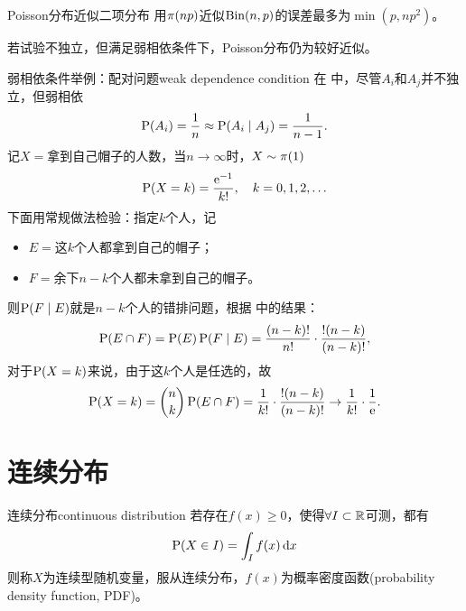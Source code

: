 \begin{theorem}{Poisson分布近似二项分布}{}
	用$\PoisDist(np)$近似$\BinDist(n,p)$的误差最多为$\min(p,np^2)$。
\end{theorem}

\begin{remark}
	若试验不独立，但满足弱相依条件下，Poisson分布仍为较好近似。
\end{remark}

\begin{example}{弱相依条件举例：配对问题}{weak dependence condition}
	在 中，尽管$A_i$和$A_j$并不独立，但弱相依
	\[
		\P(A_i) = \frac1n \approx \P(A_i \mid A_j) = \frac1{n - 1}.
	\]
	记$X =$拿到自己帽子的人数，当$n \to \infty$时，$X \sim \PoisDist(1)$
	\[
		\P(X = k) = \frac{\e^{-1}}{k!},\quad k = 0,1,2,\ldots
	\]
	\tcblower
	下面用常规做法检验：指定$k$个人，记
	\begin{itemize}
		\item $E =$这$k$个人都拿到自己的帽子；
		\item $F =$余下$n - k$个人都未拿到自己的帽子。
	\end{itemize}
	则$\P(F \mid E)$就是$n - k$个人的错排问题，根据 中的结果：
	\[
		\P(E \cap F) = \P(E)\P(F \mid E) = \frac{(n - k)!}{n!} \cdot \frac{!(n - k)}{(n - k)!},
	\]
	对于$\P(X = k)$来说，由于这$k$个人是任选的，故
	\[
		\P(X = k) = \binom nk\P(E \cap F) = \frac1{k!} \cdot \frac{!(n - k)}{(n - k)!} \to \frac{1}{k!} \cdot \frac1{\e}.
	\]
\end{example}

\section{连续分布}

\begin{definition}{连续分布}{continuous distribution}
	若存在$f(x) \geqslant 0$，使得$\forall I \subset \RR$可测，都有
	\begin{equation}\label{eq:ps-probability-density}
		\P(X \in I) = \int_If(x)\d x
	\end{equation}
	则称$X$为连续型随机变量，服从连续分布，$f(x)$为概率密度函数(probability density function, PDF)。
\end{definition}

